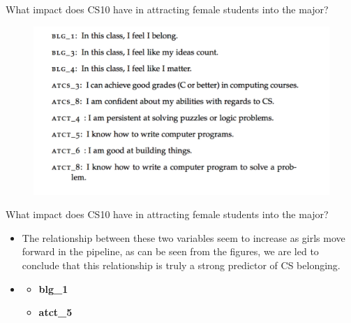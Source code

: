 \documentclass{beamer}                  %
\begin{document}
\begin{frame}{What impact does CS10 have in attracting female students into the major?}

  \begin{figure}[!htbp]
      \centering
      \includegraphics[width=1\textwidth]{BLG-ATCT}
      
  \end{figure}

\end{frame}

\begin{frame}{What impact does CS10 have in attracting female students into the major?}

  \begin{itemize}
  \item The relationship between these two variables seem to increase as girls move forward in the pipeline, as can be seen from the figures,  we are led to conclude that this relationship is truly a strong predictor of CS belonging.

  \item 
  \begin{itemize}
      \item \textbf{blg\_1}
      \item \textbf{atct\_5}
    \end{itemize}
  \end{itemize}

\end{frame}
\end{document}
